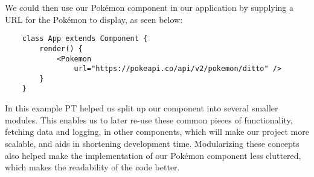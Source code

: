 We could then use our Pokémon component in our application by supplying a URL for the Pokémon to display, as seen below:

\begin{verbatim}
    class App extends Component {
        render() {
            <Pokemon
                url="https://pokeapi.co/api/v2/pokemon/ditto" />
        }
    }
\end{verbatim}

In this example PT helped us split up our component into several smaller modules.
This enables us to later re-use these common pieces of functionality, fetching data and logging, in other components, which will make our project more scalable, and aids in shortening development time.
Modularizing these concepts also helped make the implementation of our Pokémon component less cluttered, which makes the readability of the code better.

